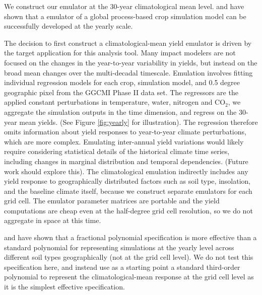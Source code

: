 \documentclass[preprint, 5p, times, twocolumn]{elsarticle}
\begin{document}
{We construct our emulator at the 30-year climatological mean level. \citet{BLANC2015} and \citet{BLANC2017} have shown that a emulator of a global process-based crop simulation model can be successfully developed at the yearly scale. 

The decision to first construct a climatological-mean yield emulator is driven by the target application for this analysis tool. Many impact modelers are not focused on the changes in the year-to-year variability in yields, but instead on the broad mean changes over the multi-decadal timescale. Emulation involves fitting individual regression models for each crop, simulation model, and 0.5 degree geographic pixel from the GGCMI Phase II data set. The regressors are the applied constant perturbations in temperature, water, nitrogen and CO$_2$, we aggregate the simulation outputs in the time dimension, and regress on the 30-year mean yields. (See Figure \ref{fig:yearly} for illustration). The regression therefore omits information about yield responses to year-to-year climate perturbations, which are more complex. Emulating inter-annual yield variations would likely require considering statistical details of the historical climate time series, including changes in marginal distribution and temporal dependencies. (Future work should explore this). The climatological emulation indirectly includes any yield response to geographically distributed factors such as soil type, insolation, and the baseline climate itself, because we construct separate emulators for each grid cell. The emulator parameter matrices are portable and the yield computations are cheap even at the half-degree grid cell resolution, so we do not aggregate in space at this time.

\citet{BLANC2015} and \citet{BLANC2017} have shown that a fractional polynomial specification is more effective than a standard polynomial for representing simulations at the yearly level across different soil types geographically (not at the grid cell level). We do not test this specification here, and instead use as a starting point a standard third-order polynomial to represent the climatological-mean response at the grid cell level as it is the simplest effective specification. 

}
\end{document}
